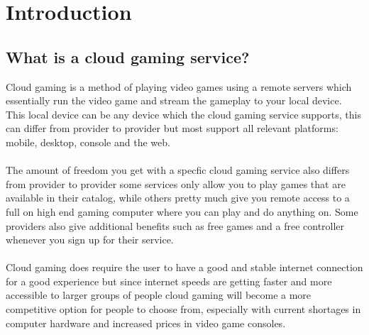 \section{Introduction}

\subsection{What is a cloud gaming service?}
Cloud gaming is a method of playing video games using a remote servers which essentially run the video game and stream the gameplay to your local device.
This local device can be any device which the cloud gaming service supports,
this can differ from provider to provider but most support all relevant platforms: mobile, desktop, console and the web. \\\\ 
The amount of freedom you get with a specfic cloud gaming service also differs from provider to provider some services only allow you to play games that are available in their catalog, while others pretty much give you remote access to a full on high end gaming computer where you can play and do anything on. Some providers also give additional benefits such as free games and a free controller whenever you sign up for their service.\\\\
Cloud gaming does require the user to have a good and stable internet connection for a good experience but since internet speeds are getting faster and more accessible to larger groups of people cloud gaming will become a more competitive option for people to choose from, especially with current shortages in computer hardware and increased prices in video game consoles.  

